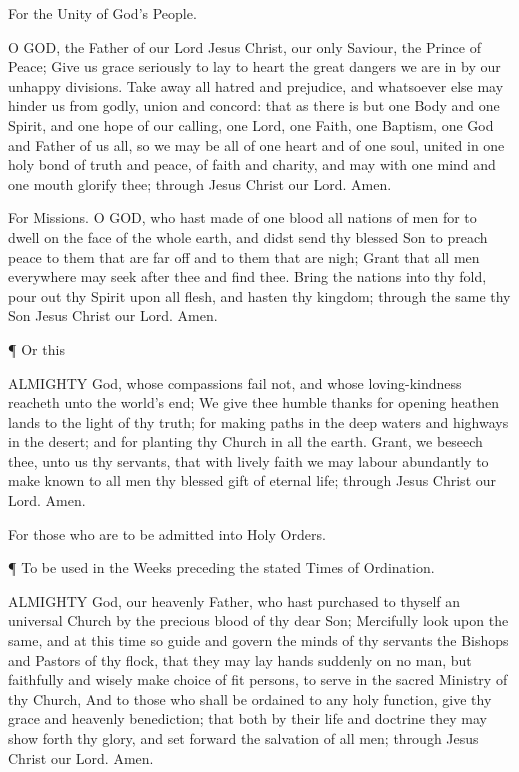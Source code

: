 For the Unity of God’s People.

O GOD, the Father of our Lord Jesus Christ, our only Saviour, the Prince of Peace; Give us grace seriously to lay to heart the great dangers we are in by our unhappy divisions. Take away all hatred and prejudice, and whatsoever else may hinder us from godly, union and concord: that as there is but one Body and one Spirit, and one hope of our calling, one Lord, one Faith, one Baptism, one God and Father of us all, so we may be all of one heart and of one soul, united in one holy bond of truth and peace, of faith and charity, and may with one mind and one mouth glorify thee; through Jesus Christ our Lord. Amen.
 

 
For Missions.
O GOD, who hast made of one blood all nations of men for to dwell on the face of the whole earth, and didst send thy blessed Son to preach peace to them that are far off and to them that are nigh; Grant that all men everywhere may seek after thee and find thee. Bring the nations into thy fold, pour out thy Spirit upon all flesh, and hasten thy kingdom; through the same thy Son Jesus Christ our Lord. Amen.  

¶ Or this

ALMIGHTY God, whose compassions fail not, and whose loving-kindness reacheth unto the world’s end; We give thee humble thanks for opening heathen lands to the light of thy truth; for making paths in the deep waters and highways in the desert; and for planting thy Church in all the earth. Grant, we beseech thee, unto us thy servants, that with lively faith we may labour abundantly to make known to all men thy blessed gift of eternal life; through Jesus Christ our Lord. Amen.

For those who are to be admitted into Holy Orders.

¶ To be used in the Weeks preceding the stated Times of Ordination.

ALMIGHTY God, our heavenly Father, who hast purchased to thyself an universal Church by the precious blood of thy dear Son; Mercifully look upon the same, and at this time so guide and govern the minds of thy servants the Bishops and Pastors of thy flock, that they may lay hands suddenly on no man, but faithfully and wisely make choice of fit persons, to serve in the sacred Ministry of thy Church, And to those who shall be ordained to any holy function, give thy grace and heavenly benediction; that both by their life and doctrine they may show forth thy glory, and set forward the salvation of all men; through Jesus Christ our Lord. Amen.

